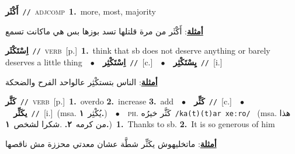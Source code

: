 \documentclass[10pt,a4paper,twoside]{article} %
\begin{document}
\begin{multicols}{2}
{\setlength\topsep{0pt}\textbf{\foreignlanguage{arabic}{أَكْثَر}}\ {\color{gray}\texttt{//}\color{black}}\ \textsc{adj\textunderscore comp}\ \textbf{1.}~more, most, majority\  \begin{flushright}\color{gray}\foreignlanguage{arabic}{\textbf{\underline{\foreignlanguage{arabic}{أمثلة}}}: أَكْثَر من مرة قلتلها تسد بوزها بس هي ماكانت تسمع}\end{flushright}\color{black}} \vspace{2mm}

{\setlength\topsep{0pt}\textbf{\foreignlanguage{arabic}{اِسْتَكْثَر}}\ {\color{gray}\texttt{//}\color{black}}\ \textsc{verb}\ [p.]\ \textbf{1.}~think that sb does not deserve anything or barely deserves a little thing\ \ $\bullet$\ \ \setlength\topsep{0pt}\textbf{\foreignlanguage{arabic}{اِسْتَكْثِر}}\ {\color{gray}\texttt{//}\color{black}}\ [c.]\ \ $\bullet$\ \ \setlength\topsep{0pt}\textbf{\foreignlanguage{arabic}{يِسْتَكْثِر}}\ {\color{gray}\texttt{//}\color{black}}\ [i.]\  \begin{flushright}\color{gray}\foreignlanguage{arabic}{\textbf{\underline{\foreignlanguage{arabic}{أمثلة}}}: الناس بتستكْثِر عالواحد الفرح والضحكة}\end{flushright}\color{black}} \vspace{2mm}

{\setlength\topsep{0pt}\textbf{\foreignlanguage{arabic}{كَثَّر}}\ {\color{gray}\texttt{//}\color{black}}\ \textsc{verb}\ [p.]\ \textbf{1.}~overdo  \textbf{2.}~increase  \textbf{3.}~add\ \ $\bullet$\ \ \setlength\topsep{0pt}\textbf{\foreignlanguage{arabic}{كَثِّر}}\ {\color{gray}\texttt{//}\color{black}}\ [c.]\ \ $\bullet$\ \ \setlength\topsep{0pt}\textbf{\foreignlanguage{arabic}{يكَثِّر}}\ {\color{gray}\texttt{//}\color{black}}\ [i.]\ \color{gray}(msa. \foreignlanguage{arabic}{يُكْثِر}~\foreignlanguage{arabic}{\textbf{١.}})\color{black}\ \ $\bullet$\ \ \textsc{ph.} \color{gray} \foreignlanguage{arabic}{كَثَّر خيرُه}\color{black}\ {\color{gray}\texttt{/{\sffamily ka(t)(t)ar xeːro}/}\color{black}}\ \color{gray} (msa. \foreignlanguage{arabic}{هذا من كرمه}~\foreignlanguage{arabic}{\textbf{٢.}}  .\foreignlanguage{arabic}{شكرا لشخص}~\foreignlanguage{arabic}{\textbf{١.}})\color{black}\ \textbf{1.}~Thanks to sb.  \textbf{2.}~It is so generous of him\  \begin{flushright}\color{gray}\foreignlanguage{arabic}{\textbf{\underline{\foreignlanguage{arabic}{أمثلة}}}: ماتخليهوش يكَثِّر شطَّة عشان معدتي محززة مش ناقصها}\end{flushright}\color{black}} \vspace{2mm}


\end{multicols}
\end{document}
